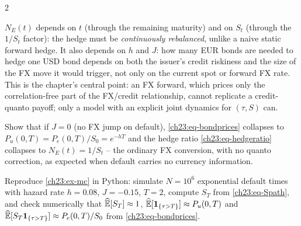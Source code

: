 \begin{paracol}{2}
\begin{remark}\label{ch23:rem-dynamic}
$N_E(t)$ depends on $t$ (through the remaining maturity) and on $S_t$ (through the $1/S_t$ factor): the hedge must
be \emph{continuously rebalanced}, unlike a naive static forward hedge. It also depends on $h$ and $J$: how many
EUR bonds are needed to hedge one USD bond depends on both the issuer's credit riskiness and the size of the FX
move it would trigger, not only on the current spot or forward FX rate. This is the chapter's central point: an
FX forward, which prices only the correlation-free part of the FX/credit relationship, cannot replicate a
credit-quanto payoff; only a model with an explicit joint dynamics for $(\tau,S)$ can.
\end{remark}

\begin{exercise}\label{ch23:ex-J0}
Show that if $J=0$ (no FX jump on default), \cref{ch23:eq-bondprices} collapses to $P_u(0,T)=P_e(0,T)/S_0=e^{-hT}$
and the hedge ratio \eqref{ch23:eq-hedgeratio} collapses to $N_E(t)=1/S_t$ -- the ordinary FX conversion, with no
quanto correction, as expected when default carries no currency information.
\end{exercise}

\begin{exercise}\label{ch23:ex-mc-exercise}
Reproduce \cref{ch23:ex-mc} in Python: simulate $N=10^6$ exponential default times with hazard rate $h=0.08$,
$J=-0.15$, $T=2$, compute $S_T$ from \cref{ch23:eq-Spath}, and check numerically that $\widehat{\mathbb{E}}[S_T]\approx1$,
$\widehat{\mathbb{E}}[\mathbf{1}_{\{\tau>T\}}]\approx P_u(0,T)$ and $\widehat{\mathbb{E}}[S_T\mathbf{1}_{\{\tau>T\}}]\approx P_e(0,T)/S_0$ from
\cref{ch23:eq-bondprices}.
\end{exercise}


\end{paracol}
